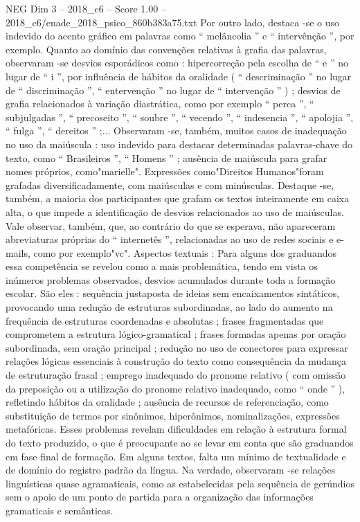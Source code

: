 \begin{textsample}{NEG Dim 3 – 2018\_c6 – Score 1.00 – 2018\_c6/enade\_2018\_psico\_860b383a75.txt}
Por outro lado, destaca -se o uso indevido do acento gráfico em palavras como “ melâncolia ” e “ intervênção ”, por exemplo.
Quanto ao domínio das convenções relativas à grafia das palavras, observaram -se desvios esporádicos como : hipercorreção pela escolha de “ e ” no lugar de “ i ”, por influência de hábitos da oralidade ( “ descriminação ” no lugar de “ discriminação ”, “ entervenção ” no lugar de “ intervenção ” ) ; desvios de grafia relacionados à variação diastrática, como por exemplo “ perca ”, “ subjulgadas ”, “ precoseito ”, “ soubre ”, “ vecendo ”, “ indesencia ”, “ apolojia ”, “ fulga ”, “ dereitos ” ;...
Observaram -se, também, muitos casos de inadequação no uso da maiúscula : uso indevido para destacar determinadas palavras-chave do texto, como “ Brasileiros ”, “ Homens ” ; ausência de maiúscula para grafar nomes próprios, como"marielle".
Expressões como"Direitos Humanos"foram grafadas diversificadamente, com maiúsculas e com minúsculas.
Destaque -se, também, a maioria dos participantes que grafam os textos inteiramente em caixa alta, o que impede a identificação de desvios relacionados ao uso de maiúsculas.
Vale observar, também, que, ao contrário do que se esperava, não apareceram abreviaturas próprias do “ internetês ”, relacionadas ao uso de redes sociais e e-mails, como por exemplo"vc".
Aspectos textuais : Para alguns dos graduandos essa competência se revelou como a mais problemática, tendo em vista os inúmeros problemas observados, desvios acumulados durante toda a formação escolar.
São eles : sequência justaposta de ideias sem encaixamentos sintáticos, provocando uma redução de estruturas subordinadas, ao lado do aumento na frequência de estruturas coordenadas e absolutas ; frases fragmentadas que comprometem a estrutura lógico-gramatical ; frases formadas apenas por oração subordinada, sem oração principal ; redução no uso de conectores para expressar relações lógicas essenciais à construção do texto como consequência da mudança de estruturação frasal ; emprego inadequado do pronome relativo ( com omissão da preposição ou a utilização do pronome relativo inadequado, como “ onde ” ), refletindo hábitos da oralidade ; ausência de recursos de referenciação, como substituição de termos por sinônimos, hiperônimos, nominalizações, expressões metafóricas.
Esses problemas revelam dificuldades em relação à estrutura formal do texto produzido, o que é preocupante ao se levar em conta que são graduandos em fase final de formação.
Em alguns textos, falta um mínimo de textualidade e de domínio do registro padrão da língua.
Na verdade, observaram -se relações linguísticas quase agramaticais, como as estabelecidas pela sequência de gerúndios sem o apoio de um ponto de partida para a organização das informações gramaticais e semânticas.

\end{textsample}
